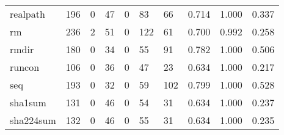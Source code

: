 \begin{longtable}{lp{2.0cm}p{2.0cm}p{2.0cm}p{2.0cm}p{2.0cm}p{2.0cm}p{2.0cm}p{2.0cm}p{2.0cm}}
realpath  &                    196 &                                  0 &                                47 &                                0 &                                83 &                              66 &                                0.714 &                                  1.000 &                                0.337 \\
rm        &                    236 &                                  2 &                                51 &                                0 &                               122 &                              61 &                                0.700 &                                  0.992 &                                0.258 \\
rmdir     &                    180 &                                  0 &                                34 &                                0 &                                55 &                              91 &                                0.782 &                                  1.000 &                                0.506 \\
runcon    &                    106 &                                  0 &                                36 &                                0 &                                47 &                              23 &                                0.634 &                                  1.000 &                                0.217 \\
seq       &                    193 &                                  0 &                                32 &                                0 &                                59 &                             102 &                                0.799 &                                  1.000 &                                0.528 \\
sha1sum   &                    131 &                                  0 &                                46 &                                0 &                                54 &                              31 &                                0.634 &                                  1.000 &                                0.237 \\
sha224sum &                    132 &                                  0 &                                46 &                                0 &                                55 &                              31 &                                0.634 &                                  1.000 &                                0.235 \\

\end{longtable}

